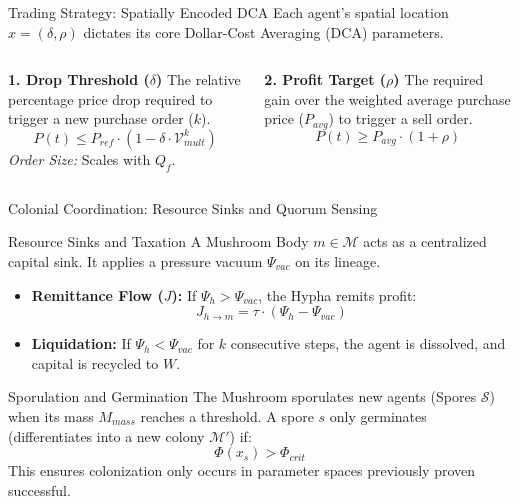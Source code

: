 \documentclass[aspectratio=169, 10pt]{beamer}
\newcommand{\MushroomSet}{\mathcal{M}}
\newcommand{\PheroField}{\Phi}
\newcommand{\Pressure}{\Psi}
\newcommand{\FlowRate}{Q_f}
\newcommand{\TaxRate}{\tau}
\newcommand{\RefPrice}{P_{ref}}
\newcommand{\DropThresh}{\delta}
\newcommand{\ProfitTarg}{\rho}
\begin{document}
	\begin{frame}{Trading Strategy: Spatially Encoded DCA}
		Each agent's spatial location $x = (\DropThresh, \ProfitTarg)$ dictates its core Dollar-Cost Averaging (DCA) parameters.
		
		\vspace{0.3cm}
		\begin{columns}
			\textbf{1. Drop Threshold ($\DropThresh$)}
			The relative percentage price drop required to trigger a new purchase order ($k$).
			\begin{equation*}
				P(t) \le \RefPrice \cdot (1 - \DropThresh \cdot \mathcal{V}_{mult}^{k})
			\end{equation*}
			\textit{Order Size:} Scales with $\FlowRate$.
			
			\textbf{2. Profit Target ($\ProfitTarg$)}
			The required gain over the weighted average purchase price ($P_{avg}$) to trigger a sell order.
			\begin{equation*}
				P(t) \ge P_{avg} \cdot (1 + \ProfitTarg)
			\end{equation*}
		\end{columns}
	\end{frame}
	
	\begin{frame}{Colonial Coordination: Resource Sinks and Quorum Sensing}
		\begin{block}{Resource Sinks and Taxation}
			A Mushroom Body $m \in \MushroomSet$ acts as a centralized capital sink. It applies a pressure vacuum $\Pressure_{vac}$ on its lineage.
			
			\begin{itemize}
				\item \textbf{Remittance Flow ($J$):} If $\Pressure_h > \Pressure_{vac}$, the Hypha remits profit:
				\[ J_{h\rightarrow m} = \TaxRate \cdot (\Pressure_h - \Pressure_{vac}) \]
				\item \textbf{Liquidation:} If $\Pressure_h < \Pressure_{vac}$ for $k$ consecutive steps, the agent is dissolved, and capital is recycled to $W$.
			\end{itemize}
		\end{block}
		
		\vspace{0.1cm}
		\begin{block}{Sporulation and Germination}
			The Mushroom sporulates new agents (Spores $\mathcal{S}$) when its mass $M_{mass}$ reaches a threshold. A spore $s$ only germinates (differentiates into a new colony $\MushroomSet'$) if:
			\begin{equation*}
				\PheroField(x_s) > \PheroField_{crit}
			\end{equation*}
			This ensures colonization only occurs in parameter spaces previously proven successful.
		\end{block}
	\end{frame}
	
\end{document}
